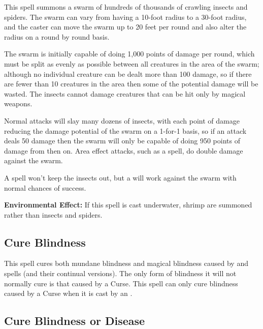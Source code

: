 \begin{multicols*}{2}
This spell summons a swarm of hundreds of thousands of crawling insects and spiders. The swarm can vary from having a 10-foot radius to a 30-foot radius, and the caster can move the swarm up to 20 feet per round and also alter the radius on a round by round basis.

The swarm is initially capable of doing 1,000 points of damage per round, which must be split as evenly as possible between all creatures in the area of the swarm; although no individual creature can be dealt more than 100 damage, so if there are fewer than 10 creatures in the area then some of the potential damage will be wasted. The insects cannot damage creatures that can be hit only by magical weapons.

Normal attacks will slay many dozens of insects, with each point of damage reducing the damage potential of the swarm on a 1-for-1 basis, so if an attack deals 50 damage then the swarm will only be capable of doing 950 points of damage from then on. Area effect attacks, such as a  spell, do double damage against the swarm.

A  spell won’t keep the insects out, but a  will work against the swarm with normal chances of success.

\textbf{Environmental Effect:} If this spell is cast underwater, shrimp are summoned rather than insects and spiders.

\subsection{Cure Blindness}\label{spell:Cure Blindness}

This spell cures both mundane blindness and magical blindness caused by  and  spells (and their continual versions). The only form of blindness it will not normally cure is that caused by a Curse. This spell can only cure blindness caused by a Curse when it is cast by an .

\subsection{Cure Blindness or Disease}\label{spell:Cure Blindness or Disease}
\end{multicols*}
